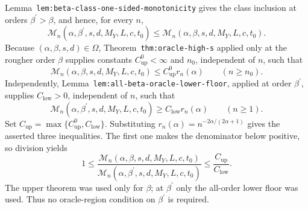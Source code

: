 Lemma~\texttt{lem:beta-class-one-sided-monotonicity} gives the class inclusion at orders \(\beta^{\prime}>\beta\), and hence, for every \(n\),
\[
\mathcal M_n(\alpha,\beta^{\prime},s,d,M_Y,L,c,t_0)
\le
\mathcal M_n(\alpha,\beta,s,d,M_Y,L,c,t_0).
\]
Because \((\alpha,\beta,s,d)\in\Omega\), Theorem~\texttt{thm:oracle-high-s} applied only at the rougher order \(\beta\) supplies constants \(C_{\mathrm{up}}^0<\infty\) and \(n_0\), independent of \(n\), such that
\[
\mathcal M_n(\alpha,\beta,s,d,M_Y,L,c,t_0)
\le C_{\mathrm{up}}^0r_n(\alpha)
\qquad(n\ge n_0).
\]
Independently, Lemma~\texttt{lem:all-beta-oracle-lower-floor}, applied at order \(\beta^{\prime}\), supplies \(C_{\mathrm{low}}>0\), independent of \(n\), such that
\[
\mathcal M_n(\alpha,\beta^{\prime},s,d,M_Y,L,c,t_0)
\ge C_{\mathrm{low}}r_n(\alpha)
\qquad(n\ge1).
\]
Set \(C_{\mathrm{up}}=\max\{C_{\mathrm{up}}^0,C_{\mathrm{low}}\}\). Substituting \(r_n(\alpha)=n^{-2\alpha/(2\alpha+1)}\) gives the asserted three inequalities. The first one makes the denominator below positive, so division yields
\[
1\le
\frac{\mathcal M_n(\alpha,\beta,s,d,M_Y,L,c,t_0)}
{\mathcal M_n(\alpha,\beta^{\prime},s,d,M_Y,L,c,t_0)}
\le\frac{C_{\mathrm{up}}}{C_{\mathrm{low}}}.
\]
The upper theorem was used only for \(\beta\); at \(\beta^{\prime}\) only the all-order lower floor was used. Thus no oracle-region condition on \(\beta^{\prime}\) is required.